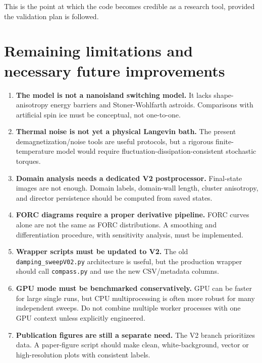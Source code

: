 \documentclass[11pt,a4paper]{article}
\newcommand{\code}[1]{\texttt{#1}}
\begin{document}
This is the point at which the code becomes credible as a research tool, provided the validation plan is followed.

\section{Remaining limitations and necessary future improvements}
\label{sec:limitations}

\begin{enumerate}[leftmargin=*]
\item \textbf{The model is not a nanoisland switching model.} It lacks shape-anisotropy energy barriers and Stoner-Wohlfarth astroids. Comparisons with artificial spin ice must be conceptual, not one-to-one.
\item \textbf{Thermal noise is not yet a physical Langevin bath.} The present demagnetization/noise tools are useful protocols, but a rigorous finite-temperature model would require fluctuation-dissipation-consistent stochastic torques.
\item \textbf{Domain analysis needs a dedicated V2 postprocessor.} Final-state images are not enough. Domain labels, domain-wall length, cluster anisotropy, and director persistence should be computed from saved states.
\item \textbf{FORC diagrams require a proper derivative pipeline.} FORC curves alone are not the same as FORC distributions. A smoothing and differentiation procedure, with sensitivity analysis, must be implemented.
\item \textbf{Wrapper scripts must be updated to V2.} The old \code{damping\_sweepV02.py} architecture is useful, but the production wrapper should call \code{compass.py} and use the new CSV/metadata columns.
\item \textbf{GPU mode must be benchmarked conservatively.} GPU can be faster for large single runs, but CPU multiprocessing is often more robust for many independent sweeps. Do not combine multiple worker processes with one GPU context unless explicitly engineered.
\item \textbf{Publication figures are still a separate need.} The V2 branch prioritizes data. A paper-figure script should make clean, white-background, vector or high-resolution plots with consistent labels.
\end{enumerate}
\end{document}
